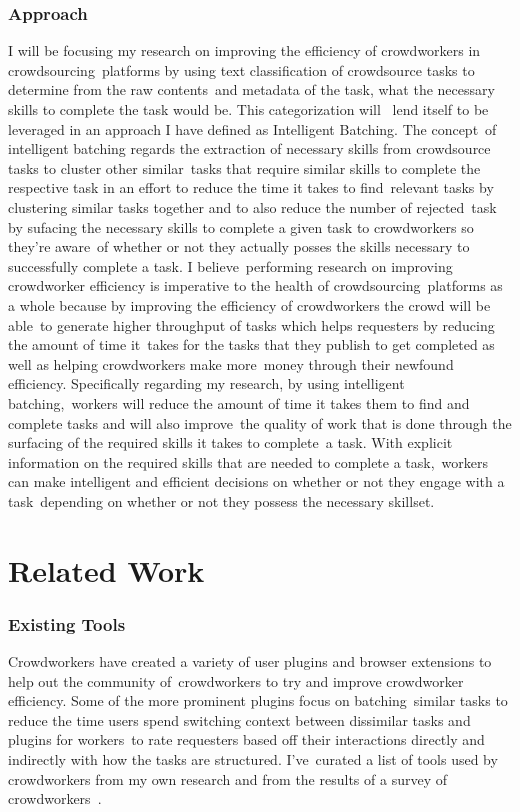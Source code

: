 \documentclass[letterpaper,12pt]{article}
\begin{document}
\subsection{Approach}
I will be focusing my research on improving the efficiency of crowdworkers in crowdsourcing\
platforms by using text classification of crowdsource tasks to determine from the raw contents\
and metadata of the task, what the necessary skills to complete the task would be. This categorization will \ 
lend itself to be leveraged in an approach I have defined as Intelligent Batching. The concept\ 
of intelligent batching regards the extraction of necessary skills from crowdsource tasks to cluster other similar\ 
tasks that require similar skills to complete the respective task in an effort to reduce the time it takes to find\
relevant tasks by clustering similar tasks together and to also reduce the number of rejected\
task by sufacing the necessary skills to complete a given task to crowdworkers so they're aware\
of whether or not they actually posses the skills necessary to successfully complete a task. I believe\
performing research on improving crowdworker efficiency is imperative to the health of crowdsourcing\
platforms as a whole because by improving the efficiency of crowdworkers the crowd will be able\
to generate higher throughput of tasks which helps requesters by reducing the amount of time it\
takes for the tasks that they publish to get completed as well as helping crowdworkers make more\
money through their newfound efficiency. Specifically regarding my research, by using intelligent batching,\
workers will reduce the amount of time it takes them to find and complete tasks and will also improve\
the quality of work that is done through the surfacing of the required skills it takes to complete\
a task. With explicit information on the required skills that are needed to complete a task,\
workers can make intelligent and efficient decisions on whether or not they engage with a task\
depending on whether or not they possess the necessary skillset.

\chapter{Related Work}

\subsection{Existing Tools}
Crowdworkers have created a variety of user plugins and browser extensions to help out the community of\
crowdworkers to try and improve crowdworker efficiency. Some of the more prominent plugins focus on batching\
similar tasks to reduce the time users spend switching context between dissimilar tasks and plugins for workers\
to rate requesters based off their interactions directly and indirectly with how the tasks are structured. I've\
curated a list of tools used by crowdworkers from my own research and from the results of a survey of crowdworkers\
\cite{Kaplan2018}. 
\end{document}
